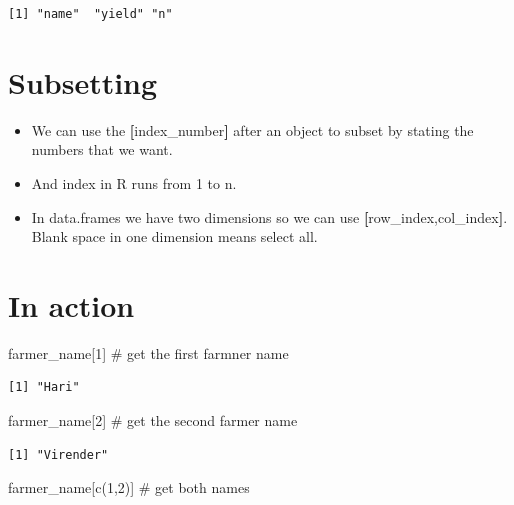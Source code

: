 \documentclass[
  letterpaper,
  DIV=11,
  numbers=noendperiod]{scrreprt}
\newenvironment{Shaded}{\begin{snugshade}}{\end{snugshade}}
\newcommand{\CommentTok}[1]{\textcolor[rgb]{0.37,0.37,0.37}{#1}}
\newcommand{\DecValTok}[1]{\textcolor[rgb]{0.68,0.00,0.00}{#1}}
\newcommand{\FunctionTok}[1]{\textcolor[rgb]{0.28,0.35,0.67}{#1}}
\newcommand{\NormalTok}[1]{\textcolor[rgb]{0.00,0.23,0.31}{#1}}
\providecommand{\tightlist}{%
  \setlength{\itemsep}{0pt}\setlength{\parskip}{0pt}}\usepackage{longtable,booktabs,array}
\begin{document}
\begin{verbatim}
[1] "name"  "yield" "n"    
\end{verbatim}

\hypertarget{subsetting}{%
\section{Subsetting}\label{subsetting}}

\begin{itemize}
\tightlist
\item
  We can use the \textbf{{[}}index\_number\textbf{{]}} after an object
  to subset by stating the numbers that we want.
\item
  And index in R runs from 1 to n.
\item
  In data.frames we have two dimensions so we can use
  \textbf{{[}}row\_index,col\_index\textbf{{]}}. Blank space in one
  dimension means select all.
\end{itemize}

\hypertarget{in-action-2}{%
\section{In action}\label{in-action-2}}

\begin{Shaded}
\begin{Highlighting}[]
\NormalTok{farmer\_name[}\DecValTok{1}\NormalTok{] }\CommentTok{\# get the first farmner name }
\end{Highlighting}
\end{Shaded}

\begin{verbatim}
[1] "Hari"
\end{verbatim}

\begin{Shaded}
\begin{Highlighting}[]
\NormalTok{farmer\_name[}\DecValTok{2}\NormalTok{] }\CommentTok{\# get the second farmer name}
\end{Highlighting}
\end{Shaded}

\begin{verbatim}
[1] "Virender"
\end{verbatim}

\begin{Shaded}
\begin{Highlighting}[]
\NormalTok{farmer\_name[}\FunctionTok{c}\NormalTok{(}\DecValTok{1}\NormalTok{,}\DecValTok{2}\NormalTok{)] }\CommentTok{\# get both names}
\end{Highlighting}
\end{Shaded}
\end{document}
